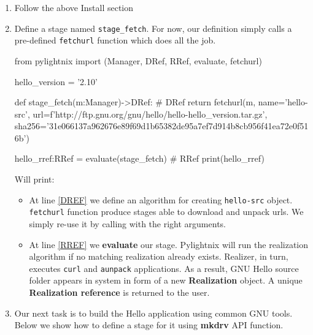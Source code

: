 \documentclass{article}
\begin{document}
\begin{enumerate}

  \item Follow the above Install section

  \item Define a stage named \texttt{stage\_fetch}. For now, our definition
    simply calls a pre-defined \texttt{fetchurl} function which does all the
    job.

    \begin{pyblock}[stdout][numbers=left]
    from pylightnix import (Manager, DRef, RRef, evaluate, fetchurl)

    hello_version = '2.10'

    def stage_fetch(m:Manager)->DRef: # DRef \label{DREF}
      return fetchurl(m,
        name='hello-src',
        url=f'http://ftp.gnu.org/gnu/hello/hello-{hello_version}.tar.gz',
        sha256='31e066137a962676e89f69d1b65382de95a7ef7d914b8cb956f41ea72e0f516b')

    hello_rref:RRef = evaluate(stage_fetch)  # RRef \label{RREF}
    print(hello_rref)
    \end{pyblock}

    Will print:
    \par
    \stdoutpythontex
    \par

    \begin{itemize}

      \item At line \ref{DREF} we define an algorithm for creating
        \texttt{hello-src} object. \texttt{fetchurl} function produce stages
        able to download and unpack urls. We simply re-use it by calling with
        the right arguments.

      \item At line \ref{RREF} we \textbf{evaluate} our stage. Pylightnix will
        run the realization algorithm if no matching realization already exists.
        Realizer, in turn, executes \texttt{curl} and \texttt{aunpack}
        applications. As a result, GNU Hello source folder appears in system in
        form of a new \textbf{Realization} object. A unique \textbf{Realization
        reference} is returned to the user.

    \end{itemize}

  \item Our next task is to build the Hello application using common GNU tools.
    Below we show how to define a stage for it using \textbf{mkdrv} API
    function.


\end{enumerate}
\end{document}
